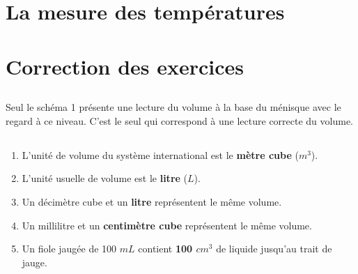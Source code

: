 \documentclass[12pt,a4paper]{article}
\begin{document}
\section{La mesure des températures}








\appendix

\newpage

\section*{Correction des exercices}

\subsection*{}

Seul le schéma 1 présente une lecture du volume à la base du ménisque avec le regard à ce niveau. C'est le seul qui correspond à une lecture correcte du volume.

\subsection*{}

\begin{enumerate}[label=\alph*)]
	\item L'unité de volume du système international est le \textbf{mètre cube} ($m^3$).
	\item L'unité usuelle de volume est le \textbf{litre} ($L$).
	\item Un décimètre cube et un \textbf{litre} représentent le même volume.
	\item Un millilitre et un \textbf{centimètre cube} représentent le même volume.
	\item Un fiole jaugée de 100 $mL$ contient \textbf{100 $cm^3$} de liquide jusqu'au trait de jauge.
\end{enumerate}

\subsection*{}
\end{document}
